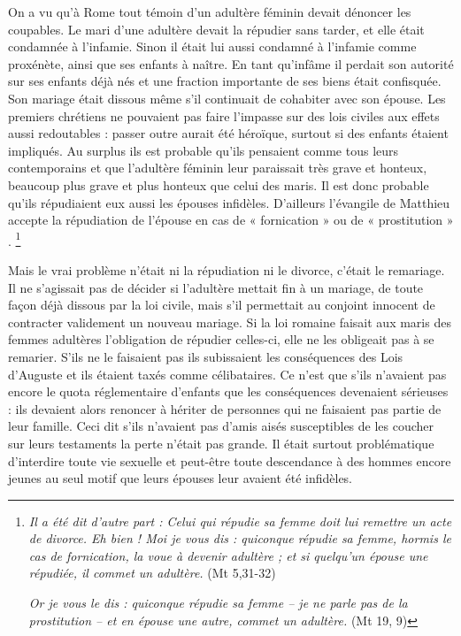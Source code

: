  On a vu qu'à Rome tout témoin d'un adultère féminin devait dénoncer les coupables. Le mari d'une adultère devait la répudier sans tarder, et elle était condamnée à l'infamie. Sinon il était lui aussi condamné à l'infamie comme proxénète, ainsi que ses enfants à naître. En tant qu'infâme il perdait son autorité sur ses enfants déjà nés et une fraction importante de ses biens était confisquée. Son mariage était dissous même s'il continuait de cohabiter avec son épouse. Les premiers chrétiens ne pouvaient pas faire l'impasse sur des lois civiles aux effets aussi redoutables : passer outre aurait été héroïque, surtout si des enfants étaient impliqués. Au surplus ils est probable qu'ils pensaient comme tous leurs contemporains et que l'adultère féminin leur paraissait très grave et honteux, beaucoup plus grave et plus honteux que celui des maris. Il est donc probable qu'ils répudiaient eux aussi les épouses infidèles. D'ailleurs l'évangile de Matthieu accepte la répudiation de l'épouse en cas de « fornication » ou de « prostitution » .
\footnote
{\emph{Il a été dit d'autre part : Celui qui répudie sa femme doit lui remettre un acte de divorce. Eh bien ! Moi je vous dis : quiconque répudie sa femme, hormis le cas de fornication, la voue à devenir adultère ; et si quelqu'un épouse une répudiée, il commet un adultère.} (Mt 5,31-32)

\emph{Or je vous le dis : quiconque répudie sa femme -- je ne parle pas de la prostitution -- et en épouse une autre, commet un adultère.} (Mt 19, 9)}

 Mais le vrai problème n'était ni la répudiation ni le divorce, c'était le remariage. Il ne s'agissait pas de décider si l'adultère mettait fin à un mariage, de toute façon déjà dissous par la loi civile, mais s'il permettait au conjoint innocent de contracter validement un nouveau mariage. Si la loi romaine faisait aux maris des femmes adultères l'obligation de répudier celles-ci, elle ne les obligeait pas à se remarier. S'ils ne le faisaient pas ils subissaient les conséquences des Lois d'Auguste et ils étaient taxés comme célibataires. Ce n'est que s'ils n'avaient pas encore le quota réglementaire d'enfants que les conséquences devenaient sérieuses : ils devaient alors renoncer à hériter de personnes qui ne faisaient pas partie de leur famille. Ceci dit s'ils n'avaient pas d'amis aisés susceptibles de les coucher sur leurs testaments la perte n'était pas grande. Il était surtout problématique d'interdire toute vie sexuelle et peut-être toute descendance à des hommes encore jeunes au seul motif que leurs épouses leur avaient été infidèles. 

